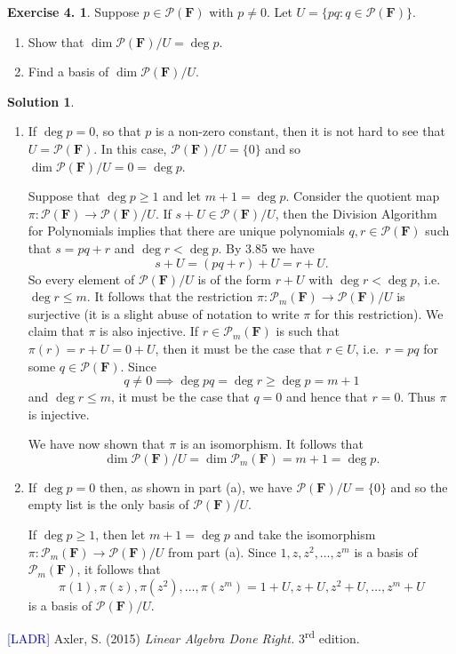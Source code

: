 \documentclass[12pt]{article}
\theoremstyle{definition}
\theoremstyle{exercise}
\newtheorem{exercise}{Exercise 4.}
\theoremstyle{solution}
\newtheorem*{solution}{Solution}
\newcommand{\poly}{\mathcal{P}}
\newcommand{\ts}{\textsuperscript}
\newcommand{\F}{\mathbf{F}}
\begin{document}
\begin{exercise}
\label{ex:11}
    Suppose \( p \in \poly(\F) \) with \( p \neq 0 \). Let \( U = \{ pq : q \in \poly(\F) \} \).
    \begin{enumerate}
        \item Show that \( \dim \poly(\F) / U = \deg p \).

        \item Find a basis of \( \dim \poly(\F) / U \).
    \end{enumerate}
\end{exercise}

\begin{solution}
    \begin{enumerate}
        \item If \( \deg p = 0 \), so that \( p \) is a non-zero constant, then it is not hard to see that \( U = \poly(\F) \). In this case, \( \poly(\F) / U = \{ 0 \} \) and so \( \dim \poly(\F) / U = 0 = \deg p \).
        
        Suppose that \( \deg p \geq 1 \) and let \( m + 1 = \deg p \). Consider the quotient map \( \pi : \poly(\F) \to \poly(\F)/U \). If \( s + U \in \poly(\F)/U \), then the Division Algorithm for Polynomials implies that there are unique polynomials \( q, r \in \poly(\F) \) such that \( s = pq + r \) and \( \deg r < \deg p \). By 3.85 we have
        \[
            s + U = (pq + r) + U = r + U.
        \]
        So every element of \( \poly(\F)/U \) is of the form \( r + U \) with \( \deg r < \deg p \), i.e.\ \( \deg r \leq m \). It follows that the restriction \( \pi : \poly_m(\F) \to \poly(\F)/U \) is surjective (it is a slight abuse of notation to write \( \pi \) for this restriction). We claim that \( \pi \) is also injective. If \( r \in \poly_m(\F) \) is such that \( \pi(r) = r + U = 0 + U \), then it must be the case that \( r \in U \), i.e.\ \( r = pq \) for some \( q \in \poly(\F) \). Since
        \[
            q \neq 0 \implies \deg pq = \deg r \geq \deg p = m + 1
        \]
        and \( \deg r \leq m \), it must be the case that \( q = 0 \) and hence that \( r = 0 \). Thus \( \pi \) is injective.

        We have now shown that \( \pi \) is an isomorphism. It follows that
        \[
            \dim \poly(\F)/U = \dim \poly_m(\F) = m + 1 = \deg p.
        \]

        \item If \( \deg p = 0 \) then, as shown in part (a), we have \( \poly(\F)/U = \{ 0 \} \) and so the empty list is the only basis of \( \poly(\F)/U \).

        If \( \deg p \geq 1 \), then let \( m + 1 = \deg p \) and take the isomorphism \( \pi : \poly_m(\F) \to \poly(\F)/U \) from part (a). Since \( 1, z, z^2, \ldots, z^m \) is a basis of \( \poly_m(\F) \), it follows that
        \[
            \pi(1), \pi(z), \pi(z^2), \ldots, \pi(z^m) = 1 + U, z + U, z^2 + U, \ldots, z^m + U
        \]
        is a basis of \( \poly(\F)/U \).
    \end{enumerate}
\end{solution}

\noindent \hrulefill

\noindent \hypertarget{ladr}{\textcolor{blue}{[LADR]} Axler, S. (2015) \textit{Linear Algebra Done Right.} 3\ts{rd} edition.}
\end{document}
